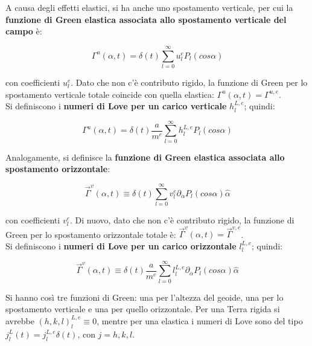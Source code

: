 \documentclass[a4paper,12pt]{book}
\begin{document}
\noindent
A causa degli effetti elastici, si ha anche uno spostamento verticale,
per cui la \textbf{funzione di Green elastica associata allo spostamento verticale del campo} è:

\begin{equation}
    \Gamma^{u}(\alpha, t) = \delta(t) \sum_{l=0}^\infty u_l^{e} P_l (cos \alpha)
\end{equation}

\noindent
con coefficienti $u_l^e$.
Dato che non c'è contributo rigido, la funzione di Green per lo spostamento verticale totale
coincide con quella elastica: $\Gamma^u (\alpha, t) = \Gamma^{u,e}$.\\

\noindent
Si definiscono i \textbf{numeri di Love per un carico verticale} $h_l^{L,e}$; quindi:

\begin{equation}
    \Gamma^{u}(\alpha, t) = \delta(t) \frac{a}{m^e} \sum_{l=0}^\infty h_l^{L,e} P_l (cos \alpha)
\end{equation}

\noindent Analogamente, si definisce la \textbf{funzione di Green elastica associata allo spostamento orizzontale}: 

\begin{equation}
    \vec{\Gamma}^v (\alpha, t) \equiv \delta(t) \sum_{l=0}^\infty v_l^{e} \partial_\alpha P_l (cos \alpha) \hat{\alpha}
\end{equation}

\noindent
con coefficienti $v_l^e$.
Di nuovo, dato che non c'è contributo rigido, la funzione di Green per lo spostamento orizzontale totale è:
$\vec \Gamma^v (\alpha, t) = \vec \Gamma^{v,e}$.\\

\noindent
Si definiscono i \textbf{numeri di Love per un carico orizzontale} $l_l^{L,e}$; quindi:

\begin{equation}
    \vec{\Gamma}^v (\alpha, t) \equiv \delta(t) \frac{a}{m^e} \sum_{l=0}^\infty l_l^{L,e} \partial_\alpha P_l (cos \alpha) \hat{\alpha}
\end{equation}

\noindent Si hanno così tre funzioni di Green: una per l'altezza del geoide, una per lo spostamento verticale e una per quello orizzontale.
Per una Terra rigida si avrebbe $(h,k,l)_l^{L,e} \equiv 0$, mentre per una elastica i numeri di Love sono del tipo $j_l^L (t) = j_l ^{L,e} \delta (t)$, con $j = h, k ,l$.
\end{document}
